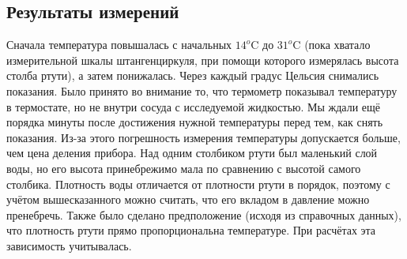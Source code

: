 	\subsection*{Результаты измерений}\n
	Сначала температура повышалась с начальных $14 ^o$C до $31 ^o$C (пока хватало измерительной шкалы штангенциркуля, при помощи которого измерялась высота столба ртути), а затем понижалась. Через каждый градус Цельсия снимались показания. Было принято во внимание то, что термометр показывал температуру в термостате, но не внутри сосуда с исследуемой жидкостью. Мы ждали ещё порядка минуты после достижения нужной температуры перед тем, как снять показания. Из-за этого погрешность измерения температуры допускается больше, чем цена деления прибора.\n\n
	Над одним столбиком ртути был маленький слой воды, но его высота принебрежимо мала по сравнению с высотой самого столбика. Плотность воды отличается от плотности ртути в порядок, поэтому с учётом вышесказанного можно считать, что его вкладом в давление можно пренебречь.\n\n
	Также было сделано предположение (исходя из справочных данных), что плотность ртути прямо пропорциональна температуре. При расчётах эта зависимость учитывалась.\n
